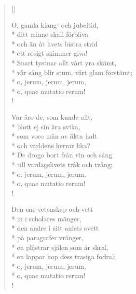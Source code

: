 
\settowidth{\versewidth}{vår sång blir stum, vårt glam förstämt;}



\begin{verse}[\versewidth]

O, gamla klang- och jubeltid,\\*
ditt minne skall förbliva\\*
och än åt livets bistra strid\\*
ett rosigt skimmer giva!\\*
Snart tystnar allt vårt yra skämt,\\*
vår sång blir stum, vårt glam förstämt;\\*
o, jerum, jerum, jerum,\\*
o, quae mutatio rerum!\\!


Var äro de, som kunde allt,\\*
blott ej sin ära svika,\\*
som voro män av äkta halt\\*
och världens herrar lika?\\*
De drogo bort från vin och sång\\*
till vardagslivets tråk och tvång;\\*
o, jerum, jerum, jerum,\\*
o, quae mutatio rerum!\\!


Den ene vetenskap och vett\\*
in i scholares mänger,\\*
den andre i sitt anlets svett\\*
på paragrafer vränger,\\*
en plåstrar själen som är skral,\\*
en lappar hop dess trasiga fodral;\\*
o, jerum, jerum, jerum,\\*
o, quae mutatio rerum!\\!


\end{verse}
